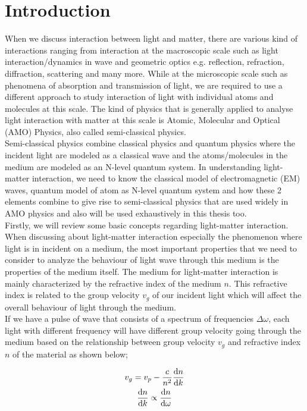 \chapter{Introduction}
When we discuss interaction between light and matter, there are various kind of interactions ranging from interaction at the macroscopic scale such as light interaction/dynamics in wave and geometric optics e.g. reflection, refraction, diffraction, scattering and many more. While at the microscopic scale such as phenomena of absorption and transmission of light, we are required to use a different approach to study interaction of light with individual atoms and molecules at this scale. The kind of physics that is generally applied to analyse light interaction with matter at this scale is Atomic, Molecular and Optical (AMO) Physics, also called semi-classical physics.\\

Semi-classical physics combine classical physics and quantum physics where the incident light are modeled as a classical wave and the atoms/molecules in the medium are modeled as an N-level quantum system. In understanding light-matter interaction, we need to know the classical model of electromagnetic (EM) waves, quantum model of atom as N-level quantum system and how these 2 elements combine to give rise to semi-classical physics that are used widely in AMO physics and also will be used exhaustively in this thesis too. \\

Firstly, we will review some basic concepts regarding light-matter interaction. When discussing about light-matter interaction especially the phenomenon where light is in incident on a medium, the most important properties that we need to consider to analyze the behaviour of light wave through this medium is the properties of the medium itself. The medium for light-matter interaction is mainly characterized by the refractive index of the medium $n$. This refractive index is related to the group velocity $v_g$ of our incident light which will affect the overall behaviour of light through the medium.\\

If we have a pulse of wave that consists of a spectrum of frequencies $\Delta\omega$, each light with different frequency will have different group velocity going through the medium based on the relationship between group velocity $v_g$ and refractive index $n$ of the material as shown below;

\begin{gather}
	v_g = v_p - \frac{c}{n^2} \dv{n}{k}\\
	\dv{n}{k} \propto \dv{n}{\omega}
\end{gather}

